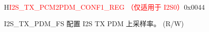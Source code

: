 \begin{register}{H}{\textcolor{red}{I2S\_TX\_PCM2PDM\_CONF1\_REG （仅适用于 I2S0）}}{0x{}0044}\label{regdesc:I2STXPCM2PDMCONF1REG}
%
%
%
\regnewline%
\begin{regdesc}\begin{reglist}
\label{fielddesc:I2STXPDMFS}\item [I2S\_TX\_PDM\_FS] 配置 I2S TX PDM 上采样率。  (R/W)
\end{reglist}\end{regdesc}
\end{register}


